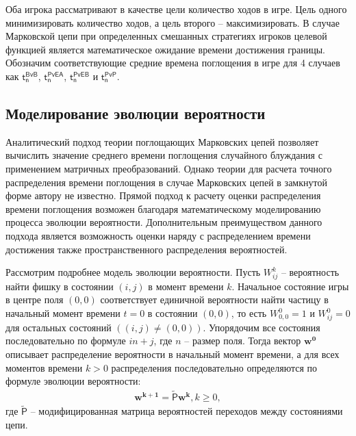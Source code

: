 Оба игрока рассматривают в качестве цели количество ходов в игре. Цель одного минимизировать количество ходов, а цель второго -- максимизировать. В случае Марковской цепи при определенных смешанных стратегиях игроков целевой функцией является математическое ожидание времени достижения границы. Обозначим соответствующие средние времена поглощения в игре для 4 случаев как $\boldsymbol{\mathsf{t_n^{BvB}}}$, $\boldsymbol{\mathsf{t_n^{PvEA}}}$, $\boldsymbol{\mathsf{t_n^{PvEB}}}$ и $\boldsymbol{\mathsf{t_n^{PvP}}}$.

\subsection{Моделирование эволюции вероятности}\label{subsec:ch3/sec2/sub2}

Аналитический подход теории поглощающих Марковских цепей позволяет вычислить значение среднего времени поглощения случайного блуждания с применением матричных преобразований. Однако теории для расчета точного распределения времени поглощения в случае Марковских цепей в замкнутой форме автору не известно. Прямой подход к расчету оценки распределения времени поглощения возможен благодаря математическому моделированию процесса эволюции вероятности. Дополнительным преимуществом данного подхода является возможность оценки наряду с распределением времени достижения также пространственного распределения вероятностей. 

Рассмотрим подробнее модель эволюции вероятности. Пусть $W_{ij}^{k}$ -- вероятность найти фишку в состоянии $(i, j)$ в момент времени $k$. Начальное состояние игры в центре поля $(0, 0)$ соответствует единичной вероятности найти частицу в начальный момент времени $t=0$ в состоянии $(0, 0)$, то есть $W_{0,0}^{0}=1$ и $W_{ij}^{0}=0$ для остальных состояний $((i, j) \neq (0, 0))$. Упорядочим все состояния последовательно по формуле $in + j$, где $n$ -- размер поля. Тогда вектор $\boldsymbol{w^{0}}$ описывает распределение вероятности в начальный момент времени, а для всех моментов времени $k > 0$ распределения последовательно определяются по формуле эволюции вероятности:
\begin{equation}
    \begin{aligned}
    \boldsymbol{w^{k+1}}=\mathsf{\widetilde{P}}\boldsymbol{w^{k}}, k \geq 0,
    \label{eq:evolution}
    \end{aligned}
\end{equation}
где $\mathsf{\widetilde{P}}$ -- модифицированная матрица вероятностей переходов между состояниями цепи. 

